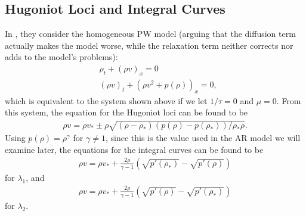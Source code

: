 \documentclass{article}
\begin{document}
\subsection{Hugoniot Loci and Integral Curves}
In \cite{AwRascle2000}, they consider the homogeneous PW model (arguing that the diffusion term actually makes the model worse, while the relaxation term neither corrects nor adds to the model's problems):
\begin{align*}
&\rho_t + \left( \rho v\right)_x = 0 \\
&\left( \rho v\right)_t + \left( \rho v^2 + p(\rho )\right)_x = 0,
\end{align*}
which is equivalent to the system shown above if we let $1/\tau = 0$ and $\mu = 0$.
From this system, the equation for the Hugoniot loci can be found to be
\begin{align*}
\rho v = \rho v_* \pm \rho \sqrt{\left( \rho - \rho_*\right) \left( p(\rho ) - p(\rho_*)\right) / \rho_*\rho }.
\end{align*}
Using $p(\rho) = \rho^{\gamma}$ for $\gamma \neq 1$, since this is the value used in the AR model we will examine later, the equations for the integral curves can be found to be
\begin{align*}
\rho v = \rho v_* + \frac{2 \rho}{\gamma - 1}\left( \sqrt{p'(\rho_*)} - \sqrt{p'(\rho)}\right)
\end{align*}
for $\lambda_1$, and 
\begin{align*}
\rho v = \rho v_* + \frac{2 \rho}{\gamma - 1}\left( \sqrt{p'(\rho)} - \sqrt{p'(\rho_*)} \right)
\end{align*}
for $\lambda_2$.
\end{document}
